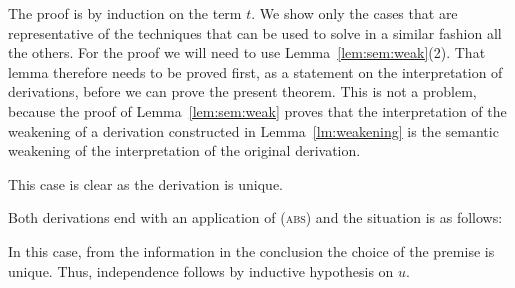 \documentclass[a4paper,UKenglish,cleveref, autoref, thm-restate]{lipics-v2021}
\providecommand*{\ifempty}[3]{\ifthenelse{\isempty{#1}}{#2}{#3}}
\newcommand{\lol}{\mathbin{\multimap}}
\newcommand{\infrule}[3][]{\infer[{\ifempty{#1}{}{(\textsc{#1})\;}}]{#3}{#2}}
\newcommand{\ts}{\vdash}
\newcommand{\hastype}[3]{#1\ts #2 : #3}
\begin{document}
The proof is by induction on the term $t$. We show only 
the cases that are representative of the techniques that can be used to solve in a similar fashion all the others.
For the proof we will need to use Lemma~\ref{lem:sem:weak}(2). That lemma therefore needs to be proved first, 
as a statement on the interpretation of derivations, before we can prove the present theorem. This is not a problem,
because the proof of Lemma~\ref{lem:sem:weak} proves that the interpretation of the weakening of a derivation 
constructed in Lemma~\ref{lm:weakening} is the semantic weakening of the interpretation of the original derivation. 
\begin{description}[font=\sc,wide]
\item[Case ($x$):] This case is clear as the derivation is unique.

\item[Case ($\lambda x.t$):] Both derivations end with an application of (\textsc{abs}) and the situation is as follows:
In this case, from the information in the conclusion the choice of the premise is unique. Thus, independence follows by inductive hypothesis on $u$.


\end{description}
\end{document}

